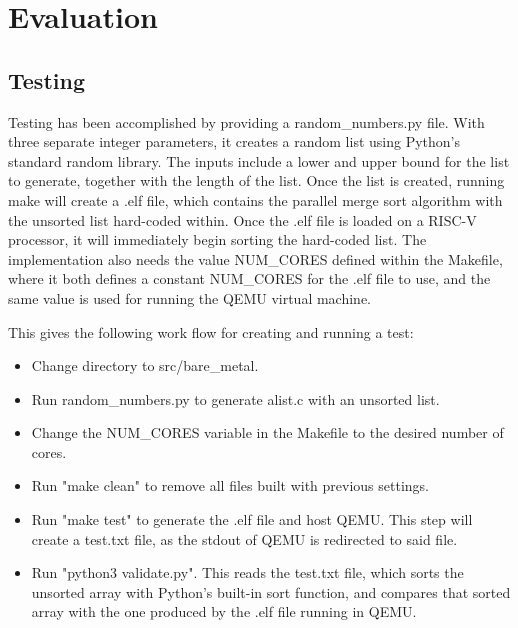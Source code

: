 \section{Evaluation}
\subsection{Testing}\label{sec:testing}
Testing has been accomplished by providing a random\_numbers.py file. With three
separate integer parameters, it creates a random list using Python's standard
random library. The inputs include a lower and upper bound for the list to
generate, together with the length of the list. Once the list is created,
running make will create a .elf file, which contains the parallel merge sort
algorithm with the unsorted list hard-coded within. Once the .elf file is loaded
on a RISC-V processor, it will immediately begin sorting the hard-coded list.
The implementation also needs the value NUM\_CORES defined within the Makefile,
where it both defines a constant NUM\_CORES for the .elf file to use, and the
same value is used for running the QEMU virtual machine.

This gives the following work flow for creating and running a test:
\begin{itemize}
\item Change directory to src/bare\_metal.
\item Run random\_numbers.py to generate alist.c with an unsorted list.
\item Change the NUM\_CORES variable in the Makefile to the desired number of
  cores.
\item Run "make clean" to remove all files built with previous settings.
\item Run "make test" to generate the .elf file and host QEMU. This step will
  create a test.txt file, as the stdout of QEMU is redirected to said file.
\item Run "python3 validate.py". This reads the test.txt file, which sorts the
  unsorted array with Python's built-in sort function, and compares that sorted
  array with the one produced by the .elf file running in QEMU.
\end{itemize}

